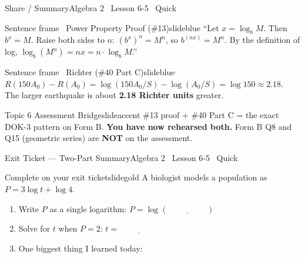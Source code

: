 \documentclass[aspectratio=169, 11pt]{beamer}
\begin{document}
\begin{frame}{Share / Summary}{Algebra 2 \textperiodcentered\ Lesson 6-5 \textperiodcentered\ Quick}
\vspace{0.2cm}
\begin{projcard}{Sentence frame \textperiodcentered\ Power Property Proof (\#13)}{slideblue}
\small
``Let \(x = \log_b M\). Then \(b^x = M\). Raise both sides to \(n\):
\((b^x)^n = M^n\), so \(b^{(nx)} = M^n\).
By the definition of log, \(\log_b(M^n) = nx = n\cdot\log_b M\).''
\end{projcard}

\vspace{0.15cm}
\begin{projcard}{Sentence frame \textperiodcentered\ Richter (\#40 Part C)}{slideblue}
\small
\(R(150A_0) - R(A_0) = \log(150A_0/S) - \log(A_0/S) = \log 150 \approx 2.18\).\\
The larger earthquake is about \textbf{2.18 Richter units} greater.
\end{projcard}

\vspace{0.1cm}
\begin{projcard}{Topic 6 Assessment Bridge}{slideaccent}
\small
\#13 proof + \#40 Part C = the exact DOK-3 pattern on Form B.
\textbf{You have now rehearsed both.}
Form B Q8 and Q15 (geometric series) are \textbf{NOT} on the assessment.
\end{projcard}
\end{frame}

\begin{frame}{Exit Ticket --- Two-Part Summary}{Algebra 2 \textperiodcentered\ Lesson 6-5 \textperiodcentered\ Quick}
\vspace{0.2cm}
\begin{projcard}{Complete on your exit ticket}{slidegold}
A biologist models a population as \(P = 3\log t + \log 4\).

\vspace{0.2cm}
\begin{enumerate}
  \setlength{\itemsep}{0.3cm}
  \item Write \(P\) as a single logarithm: \(P = \log(\underline{\hspace{2cm}})\)
  \item Solve for \(t\) when \(P = 2\): \quad \(t = \underline{\hspace{2cm}}\)
  \item One biggest thing I learned today: \underline{\hspace{5cm}}
\end{enumerate}
\end{projcard}
\end{frame}
\end{document}
